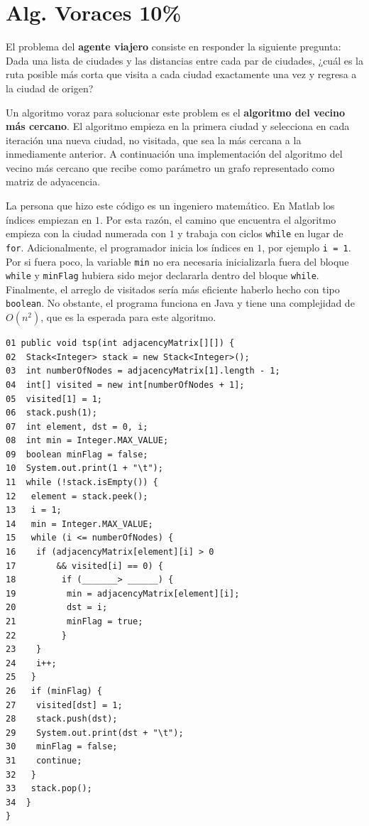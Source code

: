 \documentclass[twocolumn]{article}
\begin{document}
\section{Alg. Voraces 10\%}
El problema del \textbf{agente viajero} consiste en responder la siguiente pregunta: Dada
una lista de ciudades y las distancias entre cada par de ciudades, ¿cuál es la
ruta posible más corta que visita a cada ciudad exactamente una vez y regresa a la
ciudad de origen? 

Un algoritmo voraz para solucionar este problem es el \textbf{algoritmo del vecino más
cercano}. El algoritmo empieza en la primera ciudad y selecciona en
cada iteración una nueva ciudad, no visitada, que sea la más cercana a la inmediamente
anterior. A continuación una implementación del algoritmo del vecino más cercano
que recibe como parámetro un grafo representado como matriz de adyacencia. 

La persona que hizo este código es un ingeniero matemático. En Matlab los índices
empiezan en $1$. Por esta razón, el camino que encuentra el algoritmo empieza con la ciudad numerada con $1$ y trabaja
con ciclos \texttt{while} en lugar de \texttt{for}. Adicionalmente, el programador inicia los índices en $1$, por ejemplo \texttt{i = 1}. Por si fuera poco, 
la variable \texttt{min} no era necesaria inicializarla fuera del bloque \texttt{while} y \texttt{minFlag} hubiera sido
mejor declararla dentro del bloque \texttt{while}. Finalmente,
 el arreglo de visitados sería más eficiente haberlo hecho con tipo \texttt{boolean}. No obstante,
 el programa funciona en Java y tiene una complejidad de $O(n^2)$, que es la esperada para este algoritmo.

\begin{verbatim}
01 public void tsp(int adjacencyMatrix[][]) {
02  Stack<Integer> stack = new Stack<Integer>();
03  int numberOfNodes = adjacencyMatrix[1].length - 1;
04  int[] visited = new int[numberOfNodes + 1];
05  visited[1] = 1;
06  stack.push(1);
07  int element, dst = 0, i;
08  int min = Integer.MAX_VALUE;
09  boolean minFlag = false;
10  System.out.print(1 + "\t");
11  while (!stack.isEmpty()) {
12   element = stack.peek();
13   i = 1;
14   min = Integer.MAX_VALUE;
15   while (i <= numberOfNodes) {
16    if (adjacencyMatrix[element][i] > 0 
17        && visited[i] == 0) {
18         if (_______> ______) {
19          min = adjacencyMatrix[element][i];
20          dst = i;
21          minFlag = true;
22         }
23    }
24    i++;
25   }
26   if (minFlag) {
27    visited[dst] = 1;
28    stack.push(dst);
29    System.out.print(dst + "\t");
30    minFlag = false;
31    continue;
32   }
33   stack.pop();
34  }
}
\end{verbatim}
\end{document}
